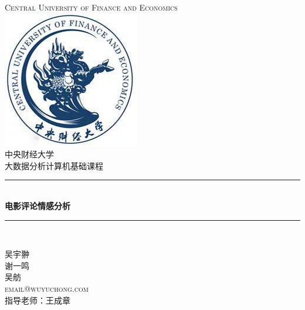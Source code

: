 \documentclass[
  hyperref,]{ctexart}
\author{}
\date{}
\begin{document}
\begin{titlepage}

\newcommand{\HRule}{\rule{\linewidth}{0.5mm}} %

\center %
 

\textsc{\LARGE Central University of Finance and Economics}\\[1.5cm] %
\includegraphics[scale=1]{cufe.jpg}\\[1cm] %
\textsc{\Large 中央财经大学}\\[0.5cm] %
\textsc{\Large 大数据分析计算机基础课程}\\[0.5cm] %


\HRule \\[0.4cm]
{ \huge \bfseries 电影评论情感分析}\\[0.4cm] %
\HRule \\[1.5cm]
 

\begin{minipage}{0.4\textwidth}
\begin{center} \large
\textsc{\large 吴宇翀}\\[0.5cm] %
\textsc{\large 谢一鸣}\\[0.5cm] %
\textsc{\large 吴舫}\\[0.5cm] %
\textsc{\large email@wuyuchong.com}\\[0.5cm] %
\textsc{\large 指导老师：王成章}\\[0.5cm] %
\end{center}


\end{minipage}
\end{titlepage}
\end{document}
